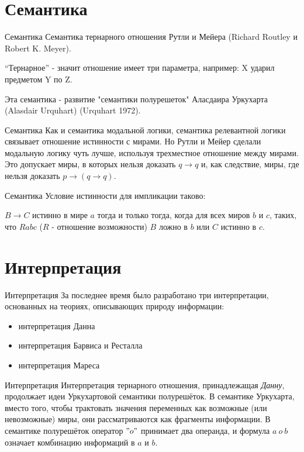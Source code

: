 \documentclass[14pt]{beamer}
\begin{document}
\section{Семантика}

\begin{frame}[nologo]{Семантика}
Семантика тернарного отношения Рутли и Мейера (Richard Routley и Robert K. 
Meyer).

``Тернарное'' - значит отношение имеет три параметра, например: X ударил 
предметом Y по Z.

Эта семантика - развитие "семантики полурешеток" Аласдаира Уркухарта (Alasdair 
Urquhart) (Urquhart 1972).
\end{frame}

\begin{frame}[nologo]{Семантика}
Как и семантика модальной логики, семантика релевантной логики связывает 
отношение истинности с мирами. Но Рутли и Мейер сделали модальную логику чуть 
лучше, используя трехместное отношение между мирами. Это допускает миры, в 
которых нельзя доказать $ q \rightarrow q $ и, как следствие, миры, где нельзя 
доказать $ p \rightarrow (q \rightarrow q) $.
\end{frame}

\begin{frame}[nologo]{Семантика}
Условие истинности для импликации таково:

$ B \rightarrow C $ истинно в мире $ a $ тогда и только тогда, когда для всех 
миров $ b $ и $ c $, таких, что $ Rabc $ ($ R $ - отношение возможности) $ B $ 
ложно в $ b $ или $ C $ истинно в $ c $.
\end{frame}

\section{Интерпретация}

\begin{frame}[nologo]{Интерпретация}
За последнее время было разработано три интерпретации, основанных на теориях, 
описывающих природу информации:
\begin{itemize}
	\item интерпретация Данна
	\item интерпретация Барвиса и Ресталла
	\item интерпретация Мареса
\end{itemize}
\end{frame}

\begin{frame}[nologo]{Интерпретация}
Интерпретация тернарного отношения, принадлежащая \emph{Данну}, продолжает идеи 
Уркухартовой семантики полурешёток. В семантике Уркухарта, вместо того, чтобы 
трактовать значения переменных как возможные (или невозможные) миры, они 
рассматриваются как фрагменты информации. В семантике полурешёток оператор $ 
"o" $ принимает два операнда, и формула $ a~o~b $ означает комбинацию 
информаций в $ a $ и $ b $.
\end{frame}
\end{document}
